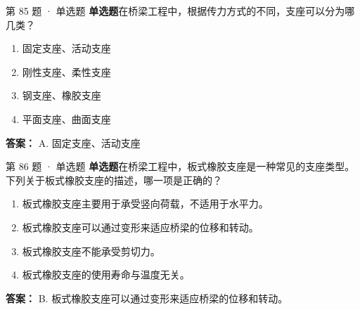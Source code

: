 \documentclass[UTF8,zihao=-4,openany]{ctexbook}
\newenvironment{choices}{\begin{enumerate}[label=\Alph*.,leftmargin=9mm,labelsep=3mm,itemsep=2pt,topsep=4pt]}{\end{enumerate}}
\newcommand{\qtype}[1]{\textcolor{brand}{\sffamily\bfseries #1}}
\begin{document}
\begin{questionbox}{第 85 题 · 单选题}
\qtype{单选题}\quad 在桥梁工程中，根据传力方式的不同，支座可以分为哪几类？
\begin{choices}
\item 固定支座、活动支座
\item 刚性支座、柔性支座
\item 钢支座、橡胶支座
\item 平面支座、曲面支座
\end{choices}
\begin{answerbox}
\textbf{答案：} A. 固定支座、活动支座
\end{answerbox}
\end{questionbox}

\begin{questionbox}{第 86 题 · 单选题}
\qtype{单选题}\quad 在桥梁工程中，板式橡胶支座是一种常见的支座类型。下列关于板式橡胶支座的描述，哪一项是正确的？
\begin{choices}
\item 板式橡胶支座主要用于承受竖向荷载，不适用于水平力。
\item 板式橡胶支座可以通过变形来适应桥梁的位移和转动。
\item 板式橡胶支座不能承受剪切力。
\item 板式橡胶支座的使用寿命与温度无关。
\end{choices}
\begin{answerbox}
\textbf{答案：} B. 板式橡胶支座可以通过变形来适应桥梁的位移和转动。
\end{answerbox}
\end{questionbox}
\end{document}
